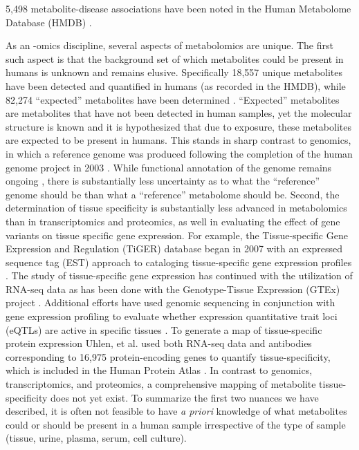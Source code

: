 \begin{DoubleSpace*}
5,498 metabolite-disease associations have been noted in the Human Metabolome Database (HMDB) \cite{wishart2018}.

As an -omics discipline, several aspects of metabolomics are unique. The first such aspect is that the background set of which metabolites could be present in humans is unknown and remains elusive. Specifically 18,557 unique metabolites have been detected and quantified in humans (as recorded in the HMDB), while 82,274 ``expected'' metabolites have been determined \cite{wishart2018}. ``Expected'' metabolites are metabolites that have not been detected in human samples, yet the molecular structure is known and it is hypothesized that due to exposure, these metabolites are expected to be present in humans. This stands in sharp contrast to genomics, in which a reference genome was produced following the completion of the human genome project in 2003 \cite{collins2003,oleary2016}. While functional annotation of the genome remains ongoing \cite{oleary2016}, there is substantially less uncertainty as to what the ``reference'' genome should be than what a ``reference'' metabolome should be. Second, the determination of tissue specificity is substantially less advanced in metabolomics than in transcriptomics and proteomics, as well in evaluating the effect of gene variants on tissue specific gene expression. For example, the Tissue-specific Gene Expression and Regulation (TiGER) database began in 2007 with an expressed sequence tag (EST) approach to cataloging tissue-specific gene expression profiles \cite{liu2008}. The study of tissue-specific gene expression has continued with the utilization of RNA-seq data as has been done with the Genotype-Tissue Expression (GTEx) project \cite{lonsdale2013}. Additional efforts have used genomic sequencing in conjunction with gene expression profiling to evaluate whether expression quantitative trait loci (eQTLs) are active in specific tissues \cite{aguet2017,brown2017}. To generate a map of tissue-specific protein expression Uhlen, et al. \cite{uhlen2015} used both RNA-seq data and antibodies corresponding to 16,975 protein-encoding genes to quantify tissue-specificity, which is included in the Human Protein Atlas \cite{uhlen2010}. In contrast to genomics, transcriptomics, and proteomics, a comprehensive mapping of metabolite tissue-specificity does not yet exist. To summarize the first two nuances we have described, it is often not feasible to have \emph{a priori} knowledge of what metabolites could or should be present in a human sample irrespective of the type of sample (tissue, urine, plasma, serum, cell culture). 


\end{DoubleSpace*}
